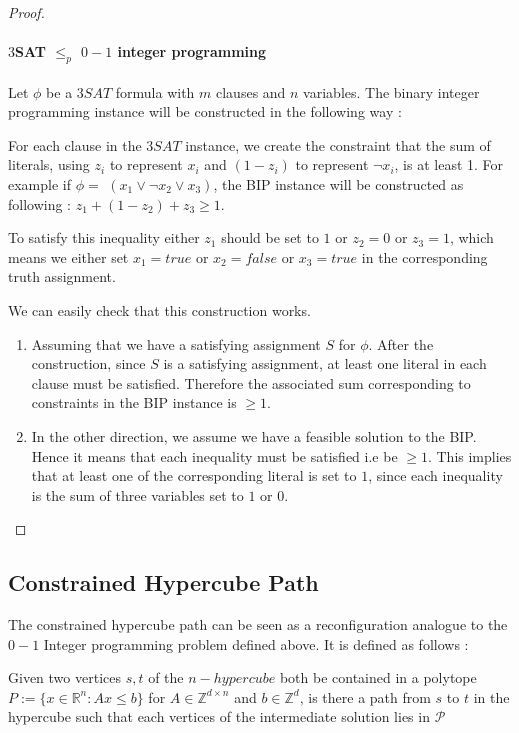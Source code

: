 \begin{proof}
\paragraph{$3$SAT $\leq_{p}$ $0-1$ integer programming} \hfill \break
Let $\phi$ be a $3SAT$ formula with $m$ clauses and $n$ variables. The binary integer programming instance will be constructed in the following way :  \hfill \break

For each clause in the $3SAT$ instance, we create the constraint that the sum of literals, using $z_i$ to represent $x_i$ and $(1-z_i)$ to represent $\neg x_i$, is at least 1. 
For example if $\phi=$ $(x_1 \vee \neg x_2 \vee x_3)$, the BIP instance will be constructed  as following : $z_1 + (1-z_2) + z_3 \geq 1$.  \hfill \break

To satisfy this inequality either $z_1$ should be set to $1$ or $z_2=0$ or $z_3=1$, which means we either set $x_1=true$ or $x_2=false$ or $x_3=true$ in the corresponding truth assignment.  \hfill \break

We can easily check that this construction works. \hfill \break
\begin{enumerate}
    \item Assuming that we have a satisfying assignment $S$ for $\phi$. After the construction, since $S$ is a satisfying assignment, at least one literal in each clause must be satisfied. Therefore the associated sum corresponding to constraints in the BIP instance is $\geq 1$.
    \item In the other direction, we assume we have a feasible solution to the BIP. Hence it means that each inequality must be satisfied i.e be $\geq 1$. This implies that at least one of the corresponding literal is set to $1$, since each inequality is the sum of three variables set to $1$ or $0$.
\end{enumerate}

\end{proof}

\subsection{Constrained Hypercube Path} 
The constrained hypercube path can be seen as a reconfiguration analogue to the $0-1$ Integer programming problem defined above. It is defined as follows : 

\begin{defn} \cite{cardinal_reconfiguration_2018}
Given two vertices $s,t$ of the $n-hypercube$ both be contained in a polytope $P := \{x \in \mathbb{R}^{n} : Ax \leq b\}$ for $A \in \mathbb{Z}^{d \times n}$ and $b \in \mathbb{Z}^{d}$, is there a path from $s$ to $t$ in the hypercube such that each vertices of the intermediate solution lies in $\mathcal{P}$
\end{defn}

